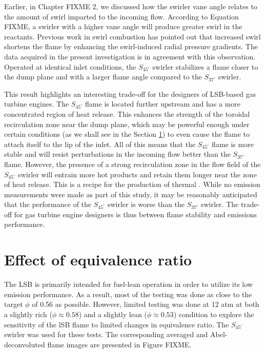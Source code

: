 Earlier, in Chapter FIXME 2, we discussed how the swirler vane angle relates to the amount of swirl imparted to the incoming flow.
According to Equation FIXME, a swirler with a higher vane angle will produce greater swirl in the reactants.
Previous work in swirl combustion\cite{1992-chan,1986-starner} has pointed out that increased swirl shortens the flame by enhancing the swirl-induced radial pressure gradients.
The data acquired in the present investigation is in agreement with this observation.
Operated at identical inlet conditions, the \(S_{45^\circ}\) swirler stabilizes a flame closer to the dump plane and with a larger flame angle compared to the \(S_{37^\circ}\) swirler.

This result highlights an interesting trade-off for the designers of LSB-based gas turbine engines.
The \(S_{45^\circ}\) flame is located further upstream and has a more concentrated region of heat release.
This enhances the strength of the toroidal recirculation zone near the dump plane, which may be powerful enough under certain conditions (as we shall see in the Section \ref{sec:eqRatioEffect}) to even cause the flame to attach itself to the lip of the inlet.
All of this means that the \(S_{45^\circ}\) flame is more stable and will resist perturbations in the incoming flow better than the \(S_{37^\circ}\) flame.
However, the presence of a strong recirculation zone in the flow field of the \(S_{45^\circ}\) swirler will entrain more hot products and retain them longer near the zone of heat release.
This is a recipe for the production of thermal .
While no emission measurements were made as part of this study, it may be reasonably anticipated that the  performance of the \(S_{45^\circ}\) swirler is worse than the \(S_{37^\circ}\) swirler.
The trade-off for gas turbine engine designers is thus between flame stability and emissions performance.

\section{Effect of equivalence ratio}
\label{sec:eqRatioEffect}

The LSB is primarily intended for fuel-lean operation in order to utilize its low  emission performance.
As a result, most of the testing was done as close to the target \(\phi\) of 0.56 as possible.
However, limited testing was done at 12 atm at both a slightly rich (\(\phi \approx 0.58\)) and a slightly lean (\(\phi \approx 0.53\)) condition to explore the sensitivity of the lSB flame to limited changes in equivalence ratio.
The \(S_{45^\circ}\) swirler was used for these tests.
The corresponding averaged and Abel-deconvoluted flame images are presented in Figure FIXME.

